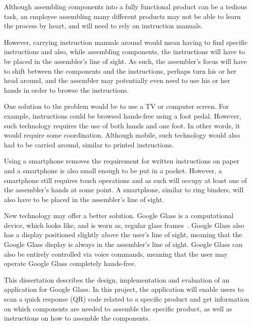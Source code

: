 %
%
%
%
%

Although assembling components into a fully functional product can be a tedious task, an employee assembling many different products may not be able to learn the process by heart, and will need to rely on instruction manuals.

However, carrying instruction manuals around would mean having to find specific instructions and also, while assembling components, the instructions will have to be placed in the assembler's line of sight. As such, the assembler's focus will have to shift between the components and the instructions, perhaps turn his or her head around, and the assembler may potentially even need to use his or her hands in order to browse the instructions. 

One solution to the problem would be to use a TV or computer screen. For example, instructions could be browsed hands-free using a foot pedal. However, such technology requires the use of both hands and one foot. In other words, it would require some coordination. Although mobile, such technology would also had to be carried around, similar to printed instructions.

Using a smartphone removes the requirement for written instructions on paper and a smartphone is also small enough to be put in a pocket. However, a smartphone still requires touch operations and as such will occupy at least one of the assembler's hands at some point. A smartphone, similar to ring binders, will also have to be placed in the assembler's line of sight.

New technology may offer a better solution. Google Glass is a computational device, which looks like, and is worn as, regular glass frames~\cite{glassStart}. Google Glass also has a display positioned slightly above the user's line of sight, meaning that the Google Glass display is always in the assembler's line of sight. Google Glass can also be entirely controlled via voice commands, meaning that the user may operate Google Glass completely hands-free.

This dissertation describes the design, implementation and evaluation of an application for Google Glass. In this project, the application will enable users to scan a quick response (QR) code related to a specific product and get information on which components are needed to assemble the specific product, as well as instructions on how to assemble the components.

